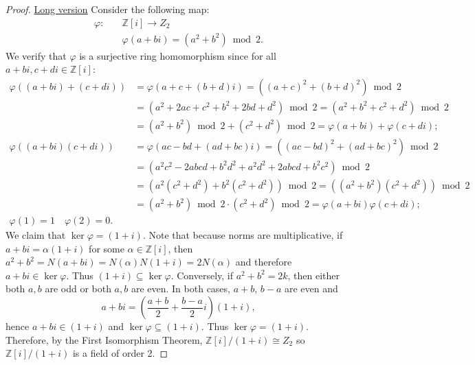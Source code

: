 \documentclass[10pt]{article}
\newcommand{\Z}{\mathbb{Z}}
\begin{document}
\begin{itemize}
\begin{enumerate}
\begin{proof}
\underline{Long version} Consider the following map:
\begin{align*}
\varphi:\quad   &\Z[i] \to Z_2 \\
                &\varphi(a+bi)=(a^2+b^2) \bmod 2.
\end{align*}
We verify that $\varphi$ is a surjective ring homomorphism since for
all $a+bi, c+di \in \Z[i]$:
    \begin{align*}
            \varphi((a+bi)+(c+di))  &=\varphi(a+c+(b+d)i)=((a+c)^2+(b+d)^2)\bmod 2 \\
                                                            &=(a^2+2ac+c^2+b^2+2bd+d^2)\bmod 2= (a^2+b^2+c^2+d^2)\bmod 2 \\
                                                            &=(a^2+b^2)\bmod 2 +(c^2+d^2)\bmod 2 = \varphi(a+bi)+\varphi(c+di); \\
            \varphi((a+bi)(c+di))       &= \varphi(ac-bd+(ad+bc)i)=((ac-bd)^2+(ad+bc)^2)\bmod 2 \\
                                                            &= (a^2c^2-2abcd+b^2d^2+a^2d^2+2abcd+b^2c^2) \bmod 2 \\
                                                            &= (a^2(c^2+d^2)+b^2(c^2+d^2))\bmod 2= ((a^2+b^2)(c^2+d^2))\bmod 2 \\
                                                            &=(a^2+b^2)\bmod 2 \cdot (c^2+d^2)\bmod 2=\varphi(a+bi)\varphi(c+di); \\
            \varphi(1)=1 \quad \varphi(2)=0.
    \end{align*}
We claim that $\ker \varphi = (1+i)$. Note that because norms are
multiplicative, if $a+bi=\alpha(1+i)$ for some $\alpha \in \Z[i]$,
then $a^2+b^2=N(a+bi)=N(\alpha)N(1+i)=2N(\alpha)$ and therefore
$a+bi \in \ker \varphi$. Thus $(1+i) \subseteq \ker \varphi$.
Conversely, if $a^2+b^2=2k$, then either both $a,b$ are odd or both
$a,b$ are even. In both cases, $a+b$, $b-a$ are even and
$$a+bi=\left(\frac{a+b}{2}+\frac{b-a}{2}i\right)(1+i),$$ hence $a+bi
\in (1+i)$ and $\ker \varphi \subseteq (1+i)$. Thus $\ker
\varphi=(1+i)$. Therefore, by the First Isomorphism Theorem,
$\Z[i]/(1+i) \cong Z_2$ so $\Z[i]/(1+i)$ is a field of order 2.


\end{proof}
\end{enumerate}
\end{itemize}
\end{document}
